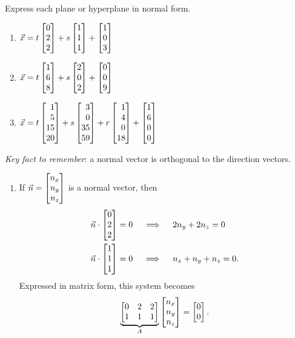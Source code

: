 \begin{exercises}
\begin{problist}
		\prob Express each plane or hyperplane in normal form.
			\begin{enumerate}
				\item $\vec x = t\mat{0\\2\\2}+s\mat{1\\1\\1}+\mat{1\\0\\3}$
				\item $\vec x = t\mat{1\\6\\8}+s\mat{2\\0\\2}+\mat{0\\0\\9}$
				\item $\vec x = t\mat{1\\5\\15\\20}+s\mat{3\\0\\35\\59}+
				r\mat{1\\4\\0\\18}+\mat{1\\6\\0\\0}$
			\end{enumerate}
		\begin{solution}
			\emph{Key fact to remember}: a normal vector is orthogonal to the direction vectors.
			\begin{enumerate}
				\item  
					If $\vec{n} = \mat{n_x\\n_y\\n_z}$ is a normal vector, then
					\begin{align*}
						\vec n \cdot \mat{0\\2\\2} &= 0  \quad\implies\quad 2n_y+2n_z = 0\\
						\vec n \cdot \mat{1\\1\\1} &= 0 \quad\implies\quad n_x+n_y+n_z = 0.
					\end{align*}
					Expressed in matrix form, this system becomes 
					\[
						\underbrace{\mat{0&2&2\\1&1&1}}_{A} \mat{n_x\\n_y\\n_z} = \mat{0\\0}.
\]
\end{enumerate}
\end{solution}
\end{problist}
\end{exercises}

